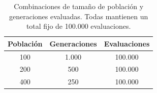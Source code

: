 \begin{table}[H]
\centering
\small
\caption{Combinaciones de tamaño de población y generaciones evaluadas. Todas mantienen un total fijo de 100.000 evaluaciones.}
\label{tab:evaluaciones}
\begin{tabular}{ccc}
\toprule
Población & Generaciones & Evaluaciones \\
\midrule
100 & 1.000 & 100.000 \\
200 & 500   & 100.000 \\
400 & 250   & 100.000 \\
\bottomrule
\end{tabular}
\end{table}
